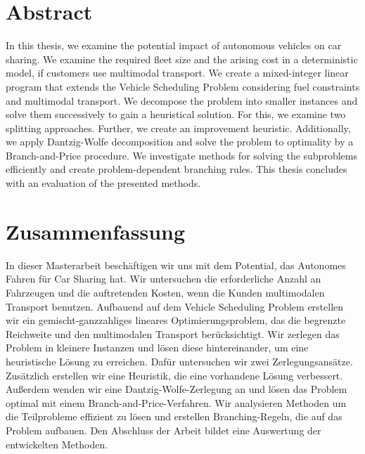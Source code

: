 \cleardoublepage

\section*{Abstract}

In this thesis, we examine the potential impact of autonomous vehicles on car sharing. We examine the required fleet size and the arising cost in a deterministic model, if customers use multimodal transport. We create a mixed-integer linear program that extends the Vehicle Scheduling Problem considering fuel constraints and multimodal transport. We decompose the problem into smaller instances and solve them successively to gain a heuristical solution. For this, we examine two splitting approaches. Further, we create an improvement heuristic. Additionally, we apply Dantzig-Wolfe decomposition and solve the problem to optimality by a Branch-and-Price procedure. We investigate methods for solving the subproblems efficiently and create problem-dependent branching rules. This thesis concludes with an evaluation of the presented methods.

\section*{Zusammenfassung}

In dieser Masterarbeit beschäftigen wir uns mit dem Potential, das Autonomes Fahren für Car Sharing hat. Wir untersuchen die erforderliche Anzahl an Fahrzeugen und die auftretenden Kosten, wenn die Kunden multimodalen Transport benutzen. Aufbauend auf dem Vehicle Scheduling Problem erstellen wir ein gemischt-ganzzahliges lineares Optimierungsproblem, das die begrenzte Reichweite und den multimodalen Transport berücksichtigt. Wir zerlegen das Problem in kleinere Instanzen und lösen diese hintereinander, um eine heuristische Lösung zu erreichen. Dafür untersuchen wir zwei Zerlegungsansätze. Zusätzlich erstellen wir eine Heuristik, die eine vorhandene Lösung verbessert. Außerdem wenden wir eine Dantzig-Wolfe-Zerlegung an und lösen das Problem optimal mit einem Branch-and-Price-Verfahren. Wir analysieren Methoden um die Teilprobleme effizient zu lösen und erstellen Branching-Regeln, die auf das Problem aufbauen. Den Abschluss der Arbeit bildet eine Auswertung der entwickelten Methoden.

